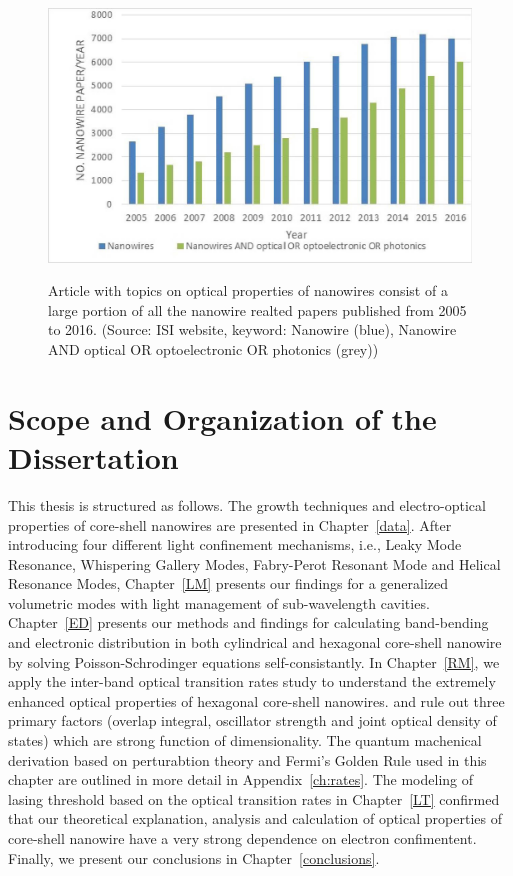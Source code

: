\begin{figure}
  \caption{Article with topics on optical properties of nanowires consist of a large portion of all the nanowire realted papers published from 2005 to 2016. (Source: ISI website, keyword: Nanowire (blue), Nanowire AND optical OR optoelectronic OR photonics (grey))}
  \centering
  \includegraphics[width=\textwidth]{pictures/Introduction/ISIPublication}
  \label{ISIPublication}
\end{figure}

\section{Scope and Organization of the Dissertation}

This thesis is structured as follows. The growth techniques and electro-optical
properties of core-shell nanowires are presented in Chapter~\ref{data}.  After
introducing four different light confinement mechanisms, i.e., Leaky Mode
Resonance, Whispering Gallery Modes, Fabry-Perot Resonant Mode and Helical
Resonance Modes, Chapter~\ref{LM} presents our findings for a generalized
volumetric modes with light management of sub-wavelength cavities.
Chapter~\ref{ED} presents our methods and findings for calculating band-bending
and electronic distribution in both cylindrical and hexagonal core-shell
nanowire by solving Poisson-Schrodinger equations self-consistantly.  In
Chapter~\ref{RM}, we apply the inter-band optical transition rates study to
understand the extremely enhanced optical properties of hexagonal core-shell
nanowires. and rule out three primary factors (overlap integral, oscillator
strength and joint optical density of states) which are strong function of
dimensionality.  The quantum machenical derivation based on perturabtion theory
and Fermi's Golden Rule used in this chapter are outlined in more detail in
Appendix~\ref{ch:rates}. The modeling of lasing threshold based on the optical
transition rates in Chapter~\ref{LT} confirmed that our theoretical
explanation, analysis and calculation of optical properties of core-shell
nanowire have a very strong dependence on electron confimentent. Finally, we
present our conclusions in Chapter~\ref{conclusions}. 

